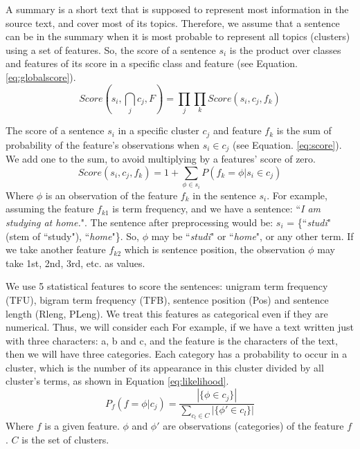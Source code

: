 \documentclass[12pt, oneside, a4paper]{article}
\begin{document}
A summary is a short text that is supposed to represent most information in the source text, and cover most of its topics.
Therefore, we assume that a sentence can be in the summary when it is most probable to represent all topics (clusters)  using a set of features.
So, the score of a sentence $ s_i $ is the product over classes and features of its score in a specific class and feature (see Equation. \ref{eq:globalscore}).
%
\begin{equation}
\label{eq:globalscore}
Score(s_i , \bigcap_{j} c_j , F) =  %
\prod_{j} \prod_{k} Score(s_i , c_j , f_k )
\end{equation}

The score of a sentence $ s_i $ in a specific cluster $ c_j $ and feature $ f_k $ is the sum of probability of the feature's observations when $ s_i \in c_j $ (see Equation. \ref{eq:score}).
We add one to the sum, to avoid multiplying by a features' score of zero.
%
\begin{equation}
\label{eq:score}
Score(s_i , c_j , f_k ) = 1 + \sum_{\phi \in s_i} {P(f_k=\phi | s_i \in c_j)}
\end{equation}
%
Where $ \phi $ is an observation of the feature $ f_k $ in the sentence $ s_i $.
For example, assuming the feature $ f_{k1} $ is term frequency, and we have a sentence: ``\textit{I am studying at home.}".
The sentence after preprocessing would be: $ s_i $ = \{``\textit{studi}"(stem of ``study"), ``\textit{home}"\}.
So, $ \phi $ may be ``\textit{studi}" or ``\textit{home}", or any other term.
If we take another feature $ f_{k2} $ which is sentence position, the observation $ \phi $ may take 1st, 2nd, 3rd, etc. as values.

We use 5 statistical features to score the sentences: unigram term frequency (TFU), bigram term frequency (TFB), sentence position (Pos) and sentence length (Rleng, PLeng).
We treat this features as categorical even if they are numerical. 
Thus, we will consider each 
For example, if we have a text written just with three characters: a, b and c, and the feature is the characters of the text, then we will have three categories.
Each category has a probability to occur in a cluster, which is the number of its appearance in this cluster divided by all cluster's terms, as shown in Equation \ref{eq:likelihood}. 
%
\begin{equation}
\label{eq:likelihood}
P_{f}(f = \phi | c_j) = \frac {|\{ \phi \in c_j \}|}{\sum_{c_l \in C}{| \{ \phi' \in c_l \} |}}
\end{equation}
Where $ f $ is a given feature.
$ \phi $ and $ \phi' $ are observations (categories) of the feature $ f $ .
$ C $ is the set of clusters.
\end{document}
